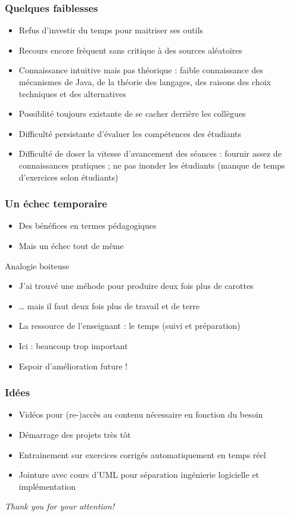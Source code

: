 \documentclass[french]{beamer}
\begin{document}
\begin{frame}
	\frametitle{Quelques faiblesses}
	\begin{itemize}
		\item Refus d’investir du temps pour maitriser ses outils
		\item Recours encore fréquent sans critique à des sources aléatoires
		\item Connaissance intuitive mais pas théorique : faible connaissance des mécanismes de Java, de la théorie des langages, des raisons des choix techniques et des alternatives
		\item Possiblité toujours existante de se cacher derrière les collègues
		\item Difficulté persistante d’évaluer les compétences des étudiants
		\item Difficulté de doser la vitesse d’avancement des séances : fournir assez de connaissances pratiques ; ne pas inonder les étudiants (manque de temps d’exercices selon étudiants)
	\end{itemize}
\end{frame}

\begin{frame}
	\frametitle{Un échec temporaire}
	\begin{itemize}
		\item Des bénéfices en termes pédagogiques
		\item Mais un échec tout de même
	\end{itemize}
	\begin{block}{Analogie boiteuse}
		\begin{itemize}
			\item \og{}J’ai trouvé une méhode pour produire deux fois plus de carottes\fg{}
			\item … mais il faut deux fois plus de travail et de terre
		\end{itemize}
	\end{block}
	\begin{itemize}
		\item La ressource de l’enseignant : le temps (suivi et préparation)
		\item Ici : beaucoup trop important
		\item Espoir d’amélioration future !
	\end{itemize}
\end{frame}

\begin{frame}
	\frametitle{Idées}
	\begin{itemize}
		\item Vidéos pour (re-)accès au contenu nécessaire en fonction du besoin
		\item Démarrage des projets très tôt
		\item Entrainement sur exercices corrigés automatiquement en temps réel
		\item Jointure avec cours d’UML pour séparation ingénierie logicielle et implémentation
	\end{itemize}
\end{frame}

\begin{frame}[plain]
	\addtocounter{framenumber}{-1}
	\begin{center}
		\huge
		\textit{Thank you for your attention!}
	\end{center}
\end{frame}
\end{document}
